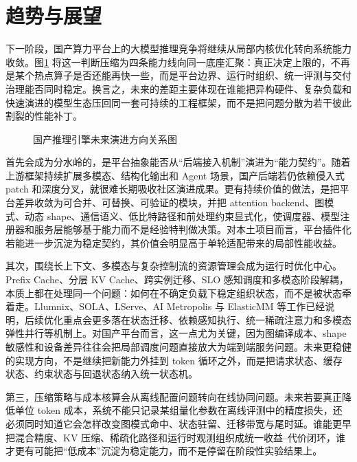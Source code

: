 \section{趋势与展望}

下一阶段，国产算力平台上的大模型推理竞争将继续从局部内核优化转向系统能力收敛。图\ref{fig:outlook-map} 将这一判断压缩为四条能力线向同一底座汇聚：真正决定上限的，不再是某个热点算子是否还能再快一些，而是平台边界、运行时组织、统一评测与交付治理能否同时稳定。换言之，未来的差距主要体现在谁能把异构硬件、复杂负载和快速演进的模型生态压回同一套可持续的工程框架，而不是把问题分散为若干彼此割裂的性能补丁。

\begin{figure}[t]
\centering
\resizebox{0.94\linewidth}{!}{}
\caption{国产推理引擎未来演进方向关系图}
\label{fig:outlook-map}
\end{figure}

首先会成为分水岭的，是平台抽象能否从“后端接入机制”演进为“能力契约”。随着上游框架持续扩展多模态、结构化输出和 Agent 场景，国产后端若仍依赖侵入式 patch 和深度分叉，就很难长期吸收社区演进成果。更有持续价值的做法，是把平台差异收敛为可合并、可替换、可验证的模块，并把 attention backend、图模式、动态 shape、通信语义、低比特路径和前处理约束显式化，使调度器、模型注册器和服务层能够基于能力而不是经验特判做决策。对本土项目而言，平台插件化若能进一步沉淀为稳定契约，其价值会明显高于单轮适配带来的局部性能收益。

其次，围绕长上下文、多模态与复杂控制流的资源管理会成为运行时优化中心。Prefix Cache、分层 KV Cache、跨实例迁移、SLO 感知调度和多模态阶段解耦，本质上都在处理同一个问题：如何在不确定负载下稳定组织状态，而不是被状态牵着走。Llumnix、SOLA、LServe、AI Metropolis 与 ElasticMM 等工作已经说明，后续优化重点会更多落在状态迁移、依赖感知执行、统一稀疏注意力和多模态弹性并行等机制上\citep{sun2024llumnix,hong2025sola,yang2025lserve,xie2025aimetropolis,liu2025elasticmm}。对国产平台而言，这一点尤为关键，因为图编译成本、shape 敏感性和设备差异往往会把局部调度问题直接放大为端到端服务问题。未来更稳健的实现方向，不是继续把新能力外挂到 token 循环之外，而是把请求状态、缓存状态、约束状态与回退状态纳入统一状态机。

第三，压缩策略与成本核算会从离线配置问题转向在线协同问题。未来若要真正降低单位 token 成本，系统不能只记录某组量化参数在离线评测中的精度损失，还必须同时知道它会怎样改变图模式命中、状态驻留、迁移带宽与尾时延。谁能更早把混合精度、KV 压缩、稀疏化路径和运行时观测组织成统一收益--代价闭环，谁才更有可能把“低成本”沉淀为稳定能力，而不是停留在阶段性实验结果上。

